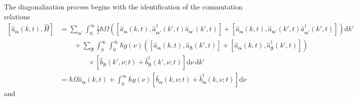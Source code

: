 \documentclass{article}
\begin{document}
The diagonalization process begins with the identification of the commutation relations
\begin{equation}
\begin{split}
\left[\hat{a}_{\bm{\alpha}}(k,t),\hat{H}\right] &= \sum_{\bm{\alpha}'}\int_0^\infty\frac{1}{2}\hbar\Omega\left(\left[\hat{a}_{\bm{\alpha}}(k,t),\hat{a}_{\bm{\alpha}'}^\dagger(k',t)\hat{a}_{\bm{\alpha}'}(k',t)\right] + \left[\hat{a}_{\bm{\alpha}}(k,t),\hat{a}_{\bm{\alpha}'}(k',t)\hat{a}_{\bm{\alpha}'}^\dagger(k',t)\right]\right)\mathrm{d}k'\\
&\qquad + \sum_{\bm{\beta}}\int_0^\infty\int_0^\infty \hbar g(\nu)\left(\left[\hat{a}_{\bm{\alpha}}(k,t),\hat{a}_{\bm{\beta}}(k',t)\right] + \left[\hat{a}_{\bm{\alpha}}(k,t),\hat{a}_{\bm{\beta}}^\dagger(k',t)\right]\right)\\
&\qquad\qquad\times\left[\hat{b}_{\bm{\beta}}(k',\nu;t) + \hat{b}_{\bm{\beta}}^\dagger(k',\nu;t)\right]\mathrm{d}\nu\,\mathrm{d}k'\\[0.5em]
&= \hbar\Omega\hat{a}_{\bm{\alpha}}(k,t) + \int_0^\infty \hbar g(\nu)\left[\hat{b}_{\bm{\alpha}}(k,\nu;t) + \hat{b}_{\bm{\alpha}}^\dagger(k,\nu;t)\right]\mathrm{d}\nu
\end{split}
\end{equation}
and
\end{document}
